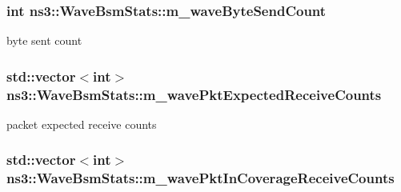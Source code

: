 \subsubsection[{\texorpdfstring{m\+\_\+wave\+Byte\+Send\+Count}{m_waveByteSendCount}}]{\setlength{\rightskip}{0pt plus 5cm}int ns3\+::\+Wave\+Bsm\+Stats\+::m\+\_\+wave\+Byte\+Send\+Count\hspace{0.3cm}{\ttfamily [private]}}\hypertarget{classns3_1_1WaveBsmStats_aea2ae38e556254fdf5f93b97df003f48}{}\label{classns3_1_1WaveBsmStats_aea2ae38e556254fdf5f93b97df003f48}


byte sent count 

\subsubsection[{\texorpdfstring{m\+\_\+wave\+Pkt\+Expected\+Receive\+Counts}{m_wavePktExpectedReceiveCounts}}]{\setlength{\rightskip}{0pt plus 5cm}std\+::vector$<$int$>$ ns3\+::\+Wave\+Bsm\+Stats\+::m\+\_\+wave\+Pkt\+Expected\+Receive\+Counts\hspace{0.3cm}{\ttfamily [private]}}\hypertarget{classns3_1_1WaveBsmStats_af37262ac6ee054f6f1039587f1460ac6}{}\label{classns3_1_1WaveBsmStats_af37262ac6ee054f6f1039587f1460ac6}


packet expected receive counts 

\subsubsection[{\texorpdfstring{m\+\_\+wave\+Pkt\+In\+Coverage\+Receive\+Counts}{m_wavePktInCoverageReceiveCounts}}]{\setlength{\rightskip}{0pt plus 5cm}std\+::vector$<$int$>$ ns3\+::\+Wave\+Bsm\+Stats\+::m\+\_\+wave\+Pkt\+In\+Coverage\+Receive\+Counts\hspace{0.3cm}{\ttfamily [private]}}\hypertarget{classns3_1_1WaveBsmStats_a96da7d1d05f93bbc60a820ec5818d63d}{}\label{classns3_1_1WaveBsmStats_a96da7d1d05f93bbc60a820ec5818d63d}



